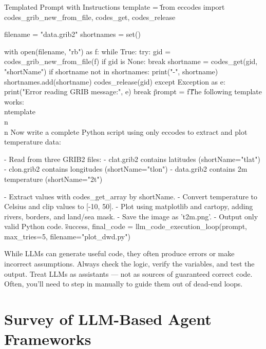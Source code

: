 \begin{codeonly}{Templated Prompt with Instructions}
template = \"\"\" 
from eccodes import codes_grib_new_from_file, codes_get, codes_release

filename = "data.grib2"
shortnames = set()

with open(filename, "rb") as f:
    while True:
        try:
            gid = codes_grib_new_from_file(f)
            if gid is None:
                break
            shortname = codes_get(gid, "shortName")
            if shortname not in shortnames:
                print("-", shortname)
                shortnames.add(shortname)
            codes_release(gid)
        except Exception as e:
            print("Error reading GRIB message:", e)
            break
\"\"\"

prompt = f\"\"\"The following template works:\\n{template}\\n\\n
Now write a complete Python script using only eccodes to extract and plot temperature data:

- Read from three GRIB2 files:
  - clat.grib2 contains latitudes (shortName="tlat")
  - clon.grib2 contains longitudes (shortName="tlon")
  - data.grib2 contains 2m temperature (shortName="2t")

- Extract values with codes_get_array by shortName.
- Convert temperature to Celsius and clip values to [-10, 50].
- Plot using matplotlib and cartopy, adding rivers, borders, and land/sea mask.
- Save the image as 't2m.png'.
- Output only valid Python code.
\"\"\"

success, final_code = llm_code_execution_loop(prompt, max_tries=5, filename="plot_dwd.py")
\end{codeonly}

\begin{recommendationbox}
While LLMs can generate useful code, they often produce errors or make incorrect assumptions. Always check the logic, verify the variables, and test the output. Treat LLMs as assistants — not as sources of guaranteed correct code. Often, you’ll need to step in manually to guide them out of dead-end loops.
\end{recommendationbox}

%
\section{Survey of LLM-Based Agent Frameworks}

